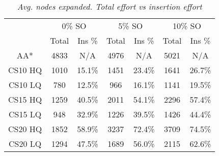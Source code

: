 \begin{table}[ht]
\caption{\emph{Avg. nodes expanded. Total effort vs insertion effort}}
\label{aha-table:searcheffort}
\begin{center}
\begin{tabular*}{0.48\textwidth}{@{\extracolsep{\fill}}ccccccc}%
  \hline
 & \multicolumn{2}{c}{0\% SO} & \multicolumn{2}{c}{5\% SO} & \multicolumn{2}{c}{10\% SO} \\
 & \small{Total} & \small{Ins \%} & \small{Total} & \small{Ins \%} & \small{Total} & \small{Ins \%} \\
  \hline
\small{AA*} & \small{4833 }& \small{N/A }& \small{4976 }& \small{N/A }& \small{5021} & \small{N/A }\\
\small{CS10 HQ }& \small{1010 }& \small{15.1\%} & \small{1451} & \small{23.4\% }& \small{1641 }& \small{26.7\% }\\
\small{CS10 LQ }& \small{780 }& \small{12.5\% }& \small{966 }& \small{16.1\% }& \small{1141 }& \small{19.5\% }\\
\small{CS15 HQ }& \small{1259 }& \small{40.5\%} & \small{2011 }& \small{54.1\% }& \small{2296 }& \small{57.4\%} \\
\small{CS15 LQ }& \small{948 }& \small{32.9\% }& \small{1226 }& \small{39.5\% }& \small{1426} & \small{44.4\% }\\
\small{CS20 HQ }& \small{1852} & \small{58.9\% }& \small{3237 }& \small{72.4\% }& \small{3709 }& \small{74.5\% }\\
\small{CS20 LQ }& \small{1294} & \small{47.5\% }& \small{1689 }& \small{56.0\% }& \small{2115 }& \small{62.6\% }\\
   \hline
\end{tabular*}
\end{center}
\end{table}
